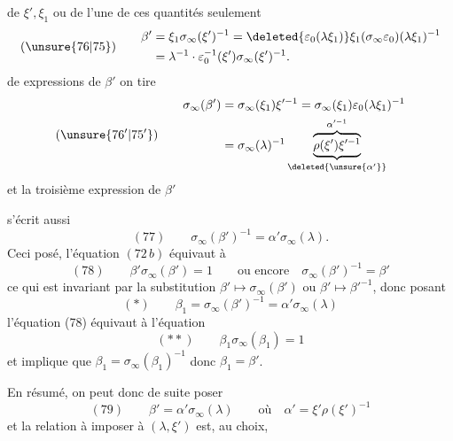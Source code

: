de $\xi',\xi_1$ ou de l'une de ces quantités seulement
\[
(\unsure{76|75})\qquad\begin{aligned}
\beta'&=\xi_1\sigma_\infty(\xi')^{-1}=\deleted{\varepsilon_0(\lambda\xi_1)}\xi_1(\sigma_\infty\varepsilon_0)(\lambda\xi_1)^{-1}\\
&=\lambda^{-1}\cdot\varepsilon_0^{-1}(\xi')\sigma_\infty(\xi')^{-1}.
\end{aligned}
\]
de   expressions de $\beta'$ on tire
\[
(\unsure{76'|75'})\qquad\begin{aligned}
\sigma_\infty(\beta')&=\sigma_\infty(\xi_1)\xi'^{-1}=\sigma_\infty(\xi_1)\varepsilon_0(\lambda\xi_1)^{-1}\\
&=\sigma_\infty(\lambda)^{-1}\underbrace{\overbrace{\rho(\xi')\xi'^{-1}}^{\alpha'^{-1}}}_{\deleted{\unsure{\alpha'}}}
\end{aligned}
\]
et la troisième expression de $\beta'$ 

\deleted{\[(\unsure{77})\qquad\beta'\sigma_\infty(\beta')=1\]}
s'écrit aussi
\[
(77)\qquad\sigma_\infty(\beta')^{-1}=\alpha'\sigma_\infty(\lambda).
\]
Ceci posé, l'équation $(72\,b)$ équivaut à
\[
(78)\qquad\beta'\sigma_\infty(\beta')=1\qquad\text{ou encore}\quad\sigma_\infty(\beta')^{-1}=\beta'
\]
ce qui est invariant par la substitution $\beta'\mapsto\sigma_\infty(\beta')$ ou $\beta'\mapsto\beta'^{-1}$, donc posant
\[
(*)\qquad\beta_1=\sigma_\infty(\beta')^{-1}=\alpha'\sigma_\infty(\lambda)
\]
l'équation (78) équivaut à l'équation
\[
(**)\qquad\beta_1\sigma_\infty(\beta_1)=1
\]
et implique que $\beta_1=\sigma_\infty(\beta_1)^{-1}$ donc $\beta_1=\beta'$.

En résumé, on peut donc de suite poser
\[
(79)\qquad\beta'=\alpha'\sigma_\infty(\lambda)\qquad\text{où}\quad\alpha'=\xi'\rho(\xi')^{-1}
\]
et la relation à imposer à $(\lambda,\xi')$ est, au choix,
